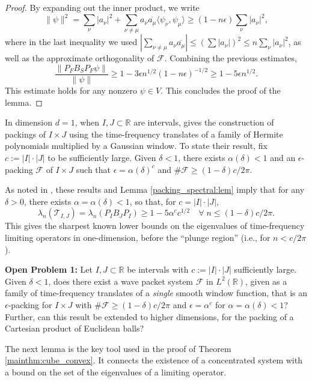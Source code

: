 \documentclass[conference]{IEEEtran}
\def\R{\mathbb{R}}
\numberwithin{equation}{section}
\newcommand{\cF}{\mathcal F}
\def\R{\mathbb{R}}
\begin{document}
\begin{proof}
By expanding out the inner product, we write
\[
\| \psi \|^2 = \sum_{\nu} |a_\nu|^2  + \sum_{\nu\neq \mu} a_\nu \overline{a_\mu} \langle \psi_\nu, \psi_\mu \rangle \geq (1 - n\epsilon) \sum_\nu |a_\nu|^2,
\]
where in the last inequality we used $\left|\sum_{\nu \neq \mu} a_\nu \overline{a_\mu} \right| \leq (\sum |a_\nu| )^2 \leq n \sum_\nu |a_\nu|^2$, as well as the approximate orthogonality of $\cF$. Combining the previous estimates,
\[
\frac{\| P_F B_S P_F \psi \|}{\| \psi \|}  \geq 1 - 3 \epsilon n^{1/2}(1-n\epsilon)^{-1/2} \geq 1 - 5 \epsilon n^{1/2}.
\]
This estimate holds for any nonzero $\psi \in V$. This concludes the proof of the lemma.
\end{proof}

In dimension $d=1$, when $I,J \subset \R$ are intervals, \cite{Kulikov24} gives the construction of packings of $I \times J$ using the time-frequency translates of a family of Hermite polynomials multiplied by a Gaussian window. To state their result, fix $c:= |I| \cdot |J|$ to be sufficiently large. 
Given $\delta < 1$, there exists $\alpha(\delta) < 1$ and an $\epsilon$-packing $\cF$ of $I \times J$ such that $\epsilon = \alpha(\delta)^c$ and $\#\cF \geq (1-\delta) c/2 \pi$. 

As noted in \cite{Kulikov24}, these results and Lemma \ref{packing_spectral:lem} imply that for any $\delta > 0$,  there exists $\alpha = \alpha(\delta) < 1$, so that, for $c = |I| \cdot |J| $,
\[
\lambda_n(\mathcal{T}_{I,J}) = \lambda_n(P_I B_J P_I) \geq 1 - 5 \alpha^c c^{1/2} \quad \forall \; n \leq (1-\delta) c/2\pi.
\]
This gives the sharpest known lower bounds on the eigenvalues of time-frequency limiting operators in one-dimension, before the ``plunge region'' (i.e., for $n < c/2\pi$). 


\textbf{Open Problem 1:} Let $I,J \subset \R$ be intervals with \(c:=|I|\cdot|J|\) sufficiently large. Given $\delta <1$, does there exist a wave packet system $\cF$ in $L^2(\R)$, given as a family of time-frequency translates of a \emph{single} smooth window function,  that is an $\epsilon$-packing for $I \times J$ with $\# \cF \geq (1-\delta) c/2\pi$ and $\epsilon = \alpha^c$ for $\alpha = \alpha(\delta) < 1$? Further, can this result be extended to higher dimensions, for the packing of a Cartesian product of Euclidean balls?

The next lemma is the key tool used in the proof of Theorem \ref{mainthm:cube_convex}. It connects the existence of a concentrated system with a bound on the set of the eigenvalues of a limiting operator.
\end{document}

